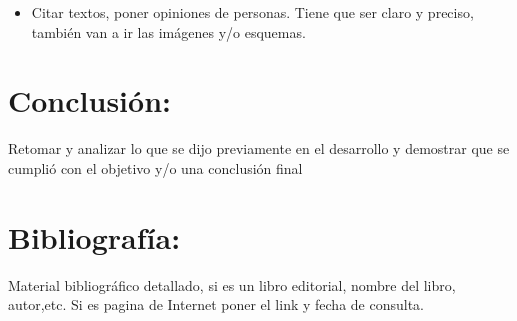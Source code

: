 \documentclass[12pt]{article}
\begin{document}
{{\begin{minipage}[c][\paperheight]{\paperwidth}
\begin{itemize}
    \item Citar textos, poner opiniones de personas. Tiene que ser claro y
        preciso, también van a ir las imágenes y/o esquemas.

\end{itemize}

\section*{Conclusión:}

Retomar y analizar lo que se dijo previamente en el desarrollo y demostrar que
se cumplió con el objetivo y/o una conclusión final 

\section*{Bibliografía:}

Material bibliográfico detallado, si es un libro editorial, nombre del libro,
autor,etc. Si es pagina de Internet poner el link y fecha de consulta.

\end{minipage}
}
}
\end{document}
